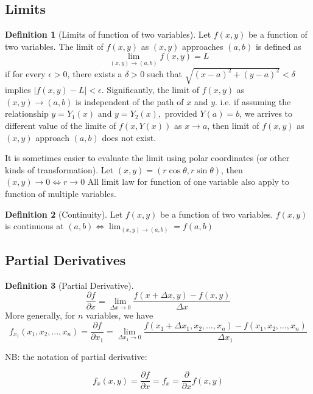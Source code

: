 \documentclass[12pt,a4paper]{article}
\theoremstyle{definition}
\newtheorem{definition}{Definition}[section]
\theoremstyle{remark}
\begin{document}
\subsection{Limits}
\begin{definition}[Limits of function of two variables]
	Let $ f(x,y) $ be a function of two variables. The limit of $ f(x,y) $ as $ (x,y) $ approaches $ (a,b) $ is defined as
	$$ \lim_{(x,y) \to (a,b)} f(x,y) = L $$
	if for every $\epsilon > 0$, there exists a $\delta > 0$ such that $ \sqrt{(x-a)^2 + (y-a)^2} < \delta $ implies $ |f(x,y) - L| < \epsilon. $
	Significantly, the limit of $ f(x,y) $ as $ (x,y) \to (a,b) $ is independent of the path of $x $ and $y$. i.e. if assuming the relationship $y = Y_1(x)$ and $y = Y_2(x),$ provided $Y(a) = b$, we arrives to different value of the limite of $f(x,Y(x)) $ as $x \to a$, then limit of $f(x,y)$ as 
$ (x,y) $ approach $ (a,b) $ does not exist.

It is sometimes easier to evaluate the limit using polar coordinates (or other kinds of transformation). Let $ (x,y) = (r\cos{\theta}, r\sin{\theta}) $, then $(x ,y) \to 0 \iff r \to 0$
	All limit law for function of one variable also apply to function of multiple variables.
\end{definition}

\begin{definition}[Continuity]
	Let $ f(x,y) $ be a function of two variables. $ f(x,y) $ is continuous at $ (a,b) \iff \displaystyle\lim_{(x,y)\to (a,b)} = f(a,b) $ 
	
\end{definition}

\subsection{Partial Derivatives}

\begin{definition}[Partial Derivative]
\[
	\frac{\partial f}{\partial x} = \lim_{\Delta x \to 0} \frac{f(x+\Delta x,y) - f(x,y)}{\Delta x}
\]
More generally, for $n$ variables, we have
\[
	f_{x_1}(x_1,x_2,\dots,x_n) = \frac{\partial f}{\partial x_1} = \lim_{\Delta x_1 \to 0} \frac{f(x_1+\Delta x_1,x_2,\dots,x_n) - f(x_1,x_2,\dots,x_n)}{\Delta x_1}
\]

NB: the notation of partial derivative:

\[
f_x(x,y) = \frac{\partial f}{\partial x}=f_x= \frac{\partial}{\partial x}f(x,y)
\]
\end{definition}
\end{document}
